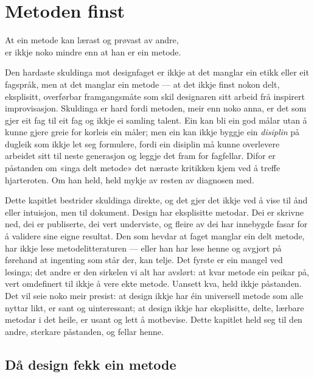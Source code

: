 \chapter{Metoden finst}

\begin{motto}
At ein metode kan lærast og prøvast av andre,\\ er ikkje noko mindre enn at han er ein metode.
\end{motto}

Den hardaste skuldinga mot designfaget er ikkje at det manglar ein etikk eller eit fagspråk, men at det manglar ein metode — at det ikkje finst nokon delt, eksplisitt, overførbar framgangsmåte som skil designaren sitt arbeid frå inspirert improvisasjon. Skuldinga er hard fordi metoden, meir enn noko anna, er det som gjer eit fag til eit fag og ikkje ei samling talent. Ein kan bli ein god målar utan å kunne gjere greie for korleis ein måler; men ein kan ikkje byggje ein \emph{disiplin} på dugleik som ikkje let seg formulere, fordi ein disiplin må kunne overlevere arbeidet sitt til neste generasjon og leggje det fram for fagfellar. Difor er påstanden om «inga delt metode» det næraste kritikken kjem ved å treffe hjarteroten. Om han held, held mykje av resten av diagnosen med.

Dette kapitlet bestrider skuldinga direkte, og det gjer det ikkje ved å vise til ånd eller intuisjon, men til dokument. Design har eksplisitte metodar. Dei er skrivne ned, dei er publiserte, dei vert underviste, og fleire av dei har innebygde fasar for å validere sine eigne resultat. Den som hevdar at faget manglar ein delt metode, har ikkje lese metodelitteraturen — eller han har lese henne og avgjort på førehand at ingenting som står der, kan telje. Det fyrste er ein mangel ved lesinga; det andre er den sirkelen vi alt har avslørt: at kvar metode ein peikar på, vert omdefinert til ikkje å vere ekte metode. Uansett kva, held ikkje påstanden. Det vil seie noko meir presist: at design ikkje har éin universell metode som alle nyttar likt, er sant og uinteressant; at design ikkje har eksplisitte, delte, lærbare metodar i det heile, er usant og lett å motbevise. Dette kapitlet held seg til den andre, sterkare påstanden, og fellar henne.

\section{Då design fekk ein metode}

